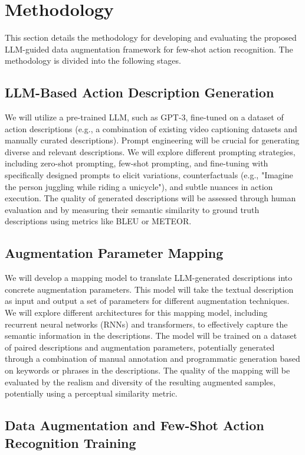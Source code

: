 \section{Methodology}
This section details the methodology for developing and evaluating the proposed LLM-guided data augmentation framework for few-shot action recognition. The methodology is divided into the following stages.


\subsection{LLM-Based Action Description Generation}
We will utilize a pre-trained LLM, such as GPT-3, fine-tuned on a dataset of action descriptions (e.g., a combination of existing video captioning datasets and manually curated descriptions). Prompt engineering will be crucial for generating diverse and relevant descriptions. We will explore different prompting strategies, including zero-shot prompting, few-shot prompting, and fine-tuning with specifically designed prompts to elicit variations, counterfactuals (e.g., "Imagine the person juggling while riding a unicycle"), and subtle nuances in action execution. The quality of generated descriptions will be assessed through human evaluation and by measuring their semantic similarity to ground truth descriptions using metrics like BLEU or METEOR.

\subsection{Augmentation Parameter Mapping}
We will develop a mapping model to translate LLM-generated descriptions into concrete augmentation parameters. This model will take the textual description as input and output a set of parameters for different augmentation techniques. We will explore different architectures for this mapping model, including recurrent neural networks (RNNs) and transformers, to effectively capture the semantic information in the descriptions. The model will be trained on a dataset of paired descriptions and augmentation parameters, potentially generated through a combination of manual annotation and programmatic generation based on keywords or phrases in the descriptions. The quality of the mapping will be evaluated by the realism and diversity of the resulting augmented samples, potentially using a perceptual similarity metric.

\subsection{Data Augmentation and Few-Shot Action Recognition Training}

